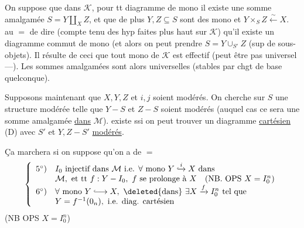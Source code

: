 
On suppose que dans $\mathcal K$, pour tt diagramme de mono
il existe une somme amalgamée $S=Y\amalg_X Z$, et que de plus $Y,Z\subseteq S$ sont des mono et $Y\times_S Z\overset{\sim}{\longleftarrow}X$.
 au $=$ de dire  
(compte tenu des hyp    faites plus haut sur $\mathcal K$) qu'il existe un diagramme commut  de mono
(et alors on peut prendre $S=Y\cup_{S'}Z$ (sup de sous-objets).
Il résulte de ceci que tout mono de $\mathcal K$ est effectif (peut être pas universel---).
Les sommes amalgamées sont alors universelles (stables par chgt de base quelconque).

Supposons maintenant que $X,Y,Z$ et $i,j$ soient modérés. On cherche sur $S$ une structure modérée telle que $Y-S$ et $Z-S$ soient modérés (auquel cas ce sera une somme amalgamée \uline{dans} $\mathcal M$).
 existe ssi on peut trouver un diagramme \uline{cartésien} (D) avec $S'$ et $Y,Z-S'$ \uline{modérés}.

Ça marchera si on suppose qu'on a de $=$
\[
\left\{\begin{array}{ll}
5^\circ)& I_0\text{ injectif dans }\mathcal M\text{ i.e. }\forall\text{ mono }Y\lhook\joinrel\xrightarrow{i}X\text{ dans}\\
&\mathcal M,\text{ et tt }f:Y-I_0,\ f\text{ se prolonge à }X\quad(\text{NB. OPS }X=I_0^n)\\
6^\circ)&\forall\text{ mono }Y\lhook\joinrel\longrightarrow X,\ \deleted{\text{dans}}\ \exists X\xrightarrow{f}I_0^n\text{ tel que}\\
&Y=f^{-1}(0_n),\text{ i.e. diag. cartésien}
\end{array}\right.
\]
(NB OPS $X=I_0^n$)

